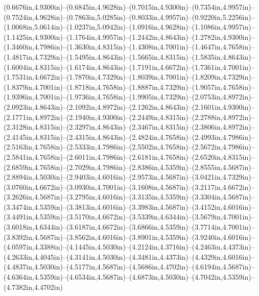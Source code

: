 (0.6676in,4.9300in)--(0.6845in,4.9628in)--(0.7015in,4.9300in)--(0.7354in,4.9957in)--(0.7524in,4.9628in)--(0.7863in,5.0285in)--(0.8033in,4.9957in)--(0.9220in,5.2256in)--(1.0068in,5.0614in)--(1.0237in,5.0942in)--(1.0916in,4.9628in)--(1.1086in,4.9957in)--(1.1425in,4.9300in)--(1.1764in,4.9957in)--(1.2442in,4.8643in)--(1.2782in,4.9300in)--(1.3460in,4.7986in)--(1.3630in,4.8315in)--(1.4308in,4.7001in)--(1.4647in,4.7658in)--(1.4817in,4.7329in)--(1.5495in,4.8643in)--(1.5665in,4.8315in)--(1.5835in,4.8643in)--(1.6004in,4.8315in)--(1.6174in,4.8643in)--(1.7191in,4.6672in)--(1.7361in,4.7001in)--(1.7531in,4.6672in)--(1.7870in,4.7329in)--(1.8039in,4.7001in)--(1.8209in,4.7329in)--(1.8379in,4.7001in)--(1.8718in,4.7658in)--(1.8887in,4.7329in)--(1.9057in,4.7658in)--(1.9396in,4.7001in)--(1.9736in,4.7658in)--(1.9905in,4.7329in)--(2.0753in,4.8972in)--(2.0923in,4.8643in)--(2.1092in,4.8972in)--(2.1262in,4.8643in)--(2.1601in,4.9300in)--(2.1771in,4.8972in)--(2.1940in,4.9300in)--(2.2449in,4.8315in)--(2.2788in,4.8972in)--(2.3128in,4.8315in)--(2.3297in,4.8643in)--(2.3467in,4.8315in)--(2.3806in,4.8972in)--(2.4145in,4.8315in)--(2.4315in,4.8643in)--(2.4824in,4.7658in)--(2.4993in,4.7986in)--(2.5163in,4.7658in)--(2.5333in,4.7986in)--(2.5502in,4.7658in)--(2.5672in,4.7986in)--(2.5841in,4.7658in)--(2.6011in,4.7986in)--(2.6181in,4.7658in)--(2.6520in,4.8315in)--(2.6859in,4.7658in)--(2.7029in,4.7986in)--(2.8386in,4.5359in)--(2.8555in,4.5687in)--(2.8894in,4.5030in)--(2.9403in,4.6016in)--(2.9573in,4.5687in)--(3.0421in,4.7329in)--(3.0760in,4.6672in)--(3.0930in,4.7001in)--(3.1608in,4.5687in)--(3.2117in,4.6672in)--(3.2626in,4.5687in)--(3.2795in,4.6016in)--(3.3135in,4.5359in)--(3.3304in,4.5687in)--(3.3474in,4.5359in)--(3.3813in,4.6016in)--(3.3983in,4.5687in)--(3.4152in,4.6016in)--(3.4491in,4.5359in)--(3.5170in,4.6672in)--(3.5339in,4.6344in)--(3.5679in,4.7001in)--(3.6018in,4.6344in)--(3.6187in,4.6672in)--(3.6866in,4.5359in)--(3.7714in,4.7001in)--(3.8392in,4.5687in)--(3.8562in,4.6016in)--(3.8901in,4.5359in)--(3.9240in,4.6016in)--(4.0597in,4.3388in)--(4.1445in,4.5030in)--(4.2124in,4.3716in)--(4.2463in,4.4373in)--(4.2633in,4.4045in)--(4.3141in,4.5030in)--(4.3481in,4.4373in)--(4.4329in,4.6016in)--(4.4837in,4.5030in)--(4.5177in,4.5687in)--(4.5686in,4.4702in)--(4.6194in,4.5687in)--(4.6364in,4.5359in)--(4.6534in,4.5687in)--(4.6873in,4.5030in)--(4.7042in,4.5359in)--(4.7382in,4.4702in) 